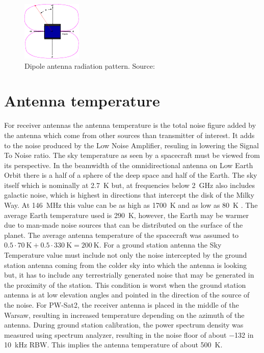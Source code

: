 \begin{figure}
    \centering
    \includegraphics[width=0.4\paperwidth]{img/6/dipole_pattern.pdf}
    \caption{Dipole antenna radiation pattern. Source: \cite{amsat_link_budget}}
    \label{link:dipole_pattern}
\end{figure}


\section{Antenna temperature}
For receiver antennas the antenna temperature is the total noise figure added by the antenna which come from other sources than transmitter of interest. It adds to the noise produced by the Low Noise Amplifier, resuling in lowering the Signal To Noise ratio.
The sky temperature as seen by a spacecraft must be viewed from its perspective. In the beamwidth of the omnidirectional antenna on Low Earth Orbit there is a half of a sphere of the deep space and half of the Earth. The sky itself which is nominally at \SI{2.7}{\kelvin} but, at frequencies below \SI{2}{\GHz} also includes galactic noise, which is highest in directions that intercept the disk of the Milky Way.  At \SI{146}{\MHz} this value can be as high as \SI{1700}{\kelvin} and as low as \SI{80}{\kelvin} \cite{amsat_link_budget}. The average Earth temperature used is \SI{290}{\kelvin}, however, the Earth may be warmer due to man-made noise sources that can be distributed on the surface of the planet. The average antenna temperature of the spacecraft was assumed to $0.5 \cdot \SI{70}{\kelvin} + 0.5 \cdot \SI{330}{\kelvin} = \SI{200}{\kelvin}$.
For a ground station antenna the Sky Temperature value must include not only the noise intercepted by the ground station antenna coming from the colder sky into which the antenna is looking but, it has to include any terrestrially generated noise that may be generated in the proximity of the station. This condition is worst when the ground station antenna is at low elevation angles and pointed in the direction of the source of the noise. For PW-Sat2, the receiver antenna is placed in the middle of the Warsaw, resulting in increased temperature depending on the azimuth of the antenna. During ground station calibration, the power spectrum density was measured using spectrum analyzer, resulting in the noise floor of about \SI{-132}{\dBm} in \SI{10}{\kHz} RBW. This implies the antenna temperature of about \SI{500}{\kelvin}.


